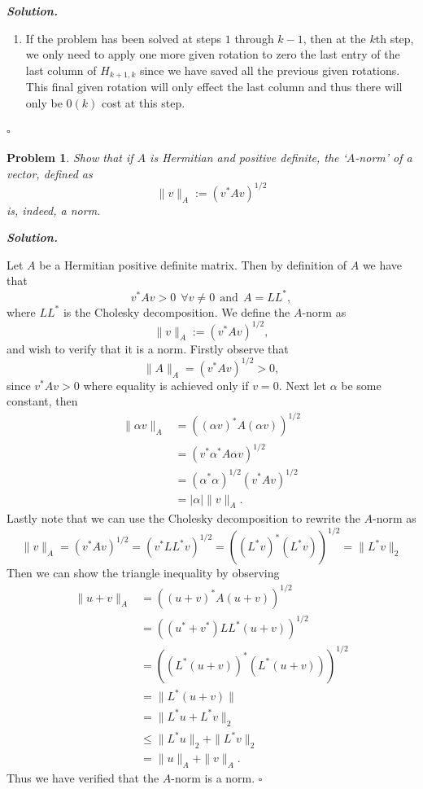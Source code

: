 \documentclass[12pt]{report}
\newtheorem{problem}{Problem}
\newenvironment{solution}[1][\it{Solution}]{\textbf{#1. } }{$\square$}
\newcommand{\paren}[1]{{\left(#1\right)}} %
\begin{document}
\begin{solution}
\begin{enumerate}
        \item
        If the problem has been solved at steps $1$ through $k-1$, then at the $k$th step, we only need to apply one more given rotation to zero the last entry of the last column of $H_{k+1,k}$ since we have saved all the previous given rotations. This final given rotation will only effect the last column and thus there will only be $0(k)$ cost at this step.

    \end{enumerate}
\end{solution}

\newpage



\begin{problem}
    Show that if $A$ is Hermitian and positive definite, the `$A$-norm' of a vector, 
defined as
\[
\| v \|_A := ( v^{*} A v )^{1/2}
\]
is, indeed, a norm.
\end{problem}

\begin{solution}
    
    Let $A$ be a Hermitian positive definite matrix. Then by definition of $A$ we have that
    \[ 
        v^*Av > 0 ~~\forall v \neq 0 ~~ \text{and} ~~ A = LL^*,
    \]
    where $LL^*$ is the Cholesky decomposition. We define the $A$-norm as
    \[
    \| v \|_A := ( v^{*} A v )^{1/2},
    \] 
    and wish to verify that it is a norm. Firstly observe that
    \[ 
        \| A \|_A = (v^* A v)^{1/2} > 0,
    \]
    since $v^*Av > 0$ where equality is achieved only if $v=0$. Next let $\alpha$ be some constant, then  
    \begin{align*}
        \| \alpha v \|_A &= \paren{(\alpha v)^* A (\alpha v)}^{1/2}\\
        &=\paren{v^*\alpha^*A\alpha v}^{1/2}\\ 
        &= (\alpha^*\alpha)^{1/2}(v^*Av)^{1/2}\\
        &= |\alpha|\|v\|_A.
    \end{align*}
    Lastly note that we can use the Cholesky decomposition to rewrite the $A$-norm as
    \[ 
        \|v\|_A = (v^*Av)^{1/2} = (v^*LL^*v)^{1/2} = ((L^*v)^*(L^*v))^{1/2} = \|L^*v\|_2
    \]
    Then we can show the triangle inequality by observing
    \begin{align*}
        \|u + v\|_A &= ((u+v)^*A(u+v))^{1/2}\\
        &= ((u^*+v^*)LL^*(u+v))^{1/2}\\
        &= ((L^*(u+v))^*(L^*(u+v)))^{1/2}\\
        &=\| L^*(u+v) \|\\
        &= \| L^*u + L^*v\|_2\\
        &\leq \|L^*u\|_2 + \|L^*v\|_2\\
        &= \|u\|_A + \|v\|_A.
    \end{align*}
    Thus we have verified that the $A$-norm is a norm. 
\end{solution}
\end{document}
